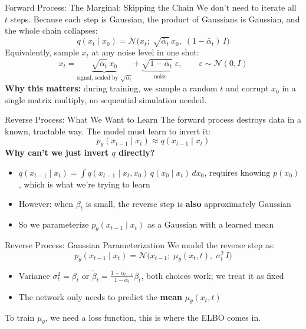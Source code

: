 \documentclass[10pt, aspectratio=169]{beamer}
\begin{document}
\begin{frame}{Forward Process: The Marginal: Skipping the Chain}
  We don't need to iterate all $t$ steps.
  Because each step is Gaussian, the product of Gaussians is Gaussian, and the whole chain collapses:
  \[
    \boxed{q(x_t \mid x_0) = \mathcal{N}\!\bigl(x_t;\;\sqrt{\bar\alpha_t}\,x_0,\;(1-\bar\alpha_t)\,I\bigr)}
  \]
  Equivalently, sample $x_t$ at any noise level in one shot:
  \[
    x_t = \underbrace{\sqrt{\bar\alpha_t}\,x_0}_{\text{signal, scaled by }\sqrt{\bar\alpha_t}}
        + \underbrace{\sqrt{1-\bar\alpha_t}\;\varepsilon}_{\text{noise}}, \qquad \varepsilon \sim \mathcal{N}(0,I)
  \]
  \textbf{Why this matters:} during training, we sample a random $t$
  and corrupt $x_0$ in a single matrix multiply, no sequential simulation needed.
\end{frame}


\begin{frame}{Reverse Process: What We Want to Learn}
  The forward process destroys data in a known, tractable way.
  The model must learn to invert it:
  \[
    p_\theta(x_{t-1} \mid x_t) \approx q(x_{t-1} \mid x_t)
  \]
  \textbf{Why can't we just invert $q$ directly?}\\
  \begin{itemize}
    \item $q(x_{t-1}\mid x_t) = \int q(x_{t-1}\mid x_t,x_0)\,q(x_0\mid x_t)\,dx_0$, requires knowing $p(x_0)$, which is what we're trying to learn
    \item However: when $\beta_t$ is small, the reverse step is \textbf{also} approximately Gaussian
    \item So we parameterize $p_\theta(x_{t-1}\mid x_t)$ as a Gaussian with a learned mean
  \end{itemize}
\end{frame}

\begin{frame}{Reverse Process: Gaussian Parameterization}
  We model the reverse step as:
  \[
    p_\theta(x_{t-1} \mid x_t) = \mathcal{N}\!\bigl(x_{t-1};\;\mu_\theta(x_t,t),\;\sigma_t^2\,I\bigr)
  \]
  \begin{itemize}
    \item Variance $\sigma_t^2 = \beta_t$ or $\tilde\beta_t = \frac{1-\bar\alpha_{t-1}}{1-\bar\alpha_t}\beta_t$, both choices work; we treat it as fixed
    \item The network only needs to predict the \textbf{mean} $\mu_\theta(x_t, t)$
  \end{itemize}
  \vspace{8pt}
  To train $\mu_\theta$, we need a loss function, this is where the ELBO comes in.
\end{frame}
\end{document}
